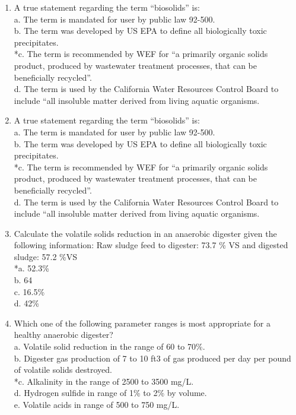 \documentclass{article}
\begin{document}
\begin{enumerate}
\item  A true statement regarding the term “biosolids” is: \\

a. The term is mandated for user by public law 92-500. \\
b. The term was developed by US EPA to define all biologically toxic precipitates. \\
*c. The term is recommended by WEF for “a primarily organic solids product, produced by wastewater treatment processes, that can be beneficially recycled”. \\
d. The term is used by the California Water Resources Control Board to include “all insoluble matter derived from living aquatic organisms. \\

\item  A true statement regarding the term “biosolids” is: \\

a. The term is mandated for user by public law 92-500. \\
b. The term was developed by US EPA to define all biologically toxic precipitates. \\
*c. The term is recommended by WEF for “a primarily organic solids product, produced by wastewater treatment processes, that can be beneficially recycled”. \\
d. The term is used by the California Water Resources Control Board to include “all insoluble matter derived from living aquatic organisms. \\

\item  Calculate the volatile solids reduction in an anaerobic digester given the following information:  Raw sludge feed to digester:  73.7 \% VS and digested sludge: 57.2 \%VS \\

*a. 52.3\% \\
b. 64 \\
c. 16.5\% \\
d. 42\% \\

\item  Which one of the following parameter ranges is most appropriate for a healthy anaerobic digester? \\

a. Volatile solid reduction in the range of 60 to 70\%. \\
b. Digester gas production of 7 to 10 ft3 of gas produced per day per pound of volatile solids destroyed. \\
*c. Alkalinity in the range of 2500 to 3500 mg/L. \\
d. Hydrogen sulfide in range of 1\% to 2\% by volume. \\
e. Volatile acids in range of 500 to 750 mg/L. \\


\end{enumerate}
\end{document}
